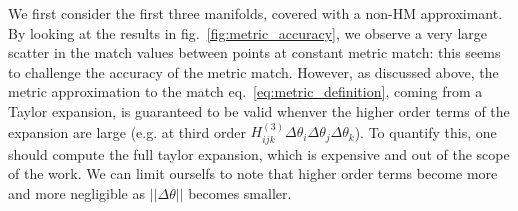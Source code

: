 \documentclass[twocolumn,showpacs,preprintnumbers,nofootinbib,prd,
superscriptaddress,10pt]{revtex4-2}
\begin{document}

We first consider the first three manifolds, covered with a non-HM approximant.
By looking at the results in fig.~\ref{fig:metric_accuracy}, we observe a very large scatter in the match values between points at constant metric match: this seems to challenge the accuracy of the metric match.
However, as discussed above, the metric approximation to the match eq.~\eqref{eq:metric_definition}, coming from a Taylor expansion, is guaranteed to be valid whenver the higher order terms of the expansion are large (e.g. at third order $H^{(3)}_{ijk}\Delta\theta_i\Delta\theta_j\Delta\theta_k$). To quantify this, one should compute the full taylor expansion, which is expensive and out of the scope of the work.
We can limit ourselfs to note that higher order terms become more and more negligible as $||\Delta\theta||$ becomes smaller.
\end{document}
